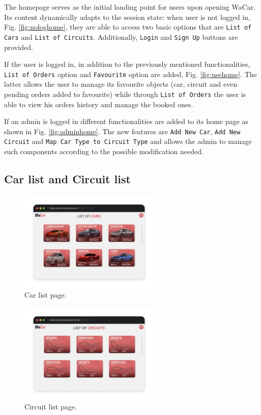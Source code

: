 The homepage serves as the initial landing point for users upon opening WaCar. Its content dynamically adapts to the session state: when user is not logged in, Fig. \ref{fig:nologhome}, they are able to access two basic options that are \texttt{List of Cars} and \texttt{List of Circuits}. Additionally, \texttt{Login} and \texttt{Sign Up} buttons are provided.

If the user is logged in, in addition to the previously mentioned functionalities, \texttt{List of Orders} option and \texttt{Favourite} option are added, Fig. \ref{fig:usehome}. The latter allows the user to manage its favourite objects (car, circuit and even pending orders added to favourite) while through \texttt{List of Orders} the user is able to view his orders history and manage the booked ones.

If an admin is logged in different functionalities are added to its home page as shown in Fig. \ref{fig:adminhome}. The new features are \texttt{Add New Car}, \texttt{Add New Circuit} and \texttt{Map Car Type to Circuit Type} and allows the admin to manage such components according to the possible modification needed.

\subsection{Car list and Circuit list}

\begin{figure}[h]
  \centering
    \includegraphics[width=0.6\textwidth]{mockup/CarList.png}
    \caption{Car list page.}
    \label{fig:carlist}
\end{figure}

\begin{figure}[h]
    \centering
    \includegraphics[width=0.6\textwidth]{mockup/CircuitList.png}
    \caption{Circuit list page.}
    \label{fig:circuitlist}
\end{figure}

